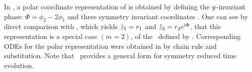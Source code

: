In , a polar coordinate representation of 
is obtained by defining the $g$-invariant phase: $\Phi = \phi_2 - 2 \phi_1$
and three symmetry invariant coordinates .
One can see by direct comparison with , which
yields $\hat{z}_1 = r_1$ and $\hat{z}_2 = r_2 e^{\mathrm{i} \Phi}$, that this
representation is a special case $(m=2)$, of the \slice\ defined by
. Corresponding ODEs for the polar representation
were obtained in  by  chain rule and substitution. Note
that \mslices\ provides a general form  for symmetry
reduced time evolution.
